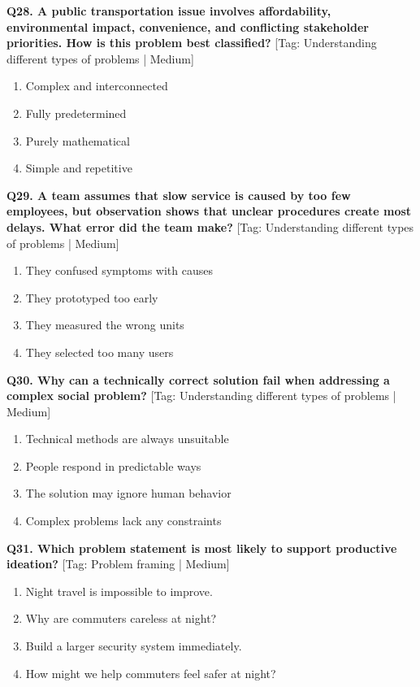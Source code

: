\noindent\textbf{Q28. A public transportation issue involves affordability, environmental impact, convenience, and conflicting stakeholder priorities. How is this problem best classified?} \hfill [Tag: Understanding different types of problems | Medium]
\begin{enumerate}[label=(\alph*),topsep=2pt,itemsep=1pt,partopsep=0pt,parsep=0pt]
    \item {Complex and interconnected}
    \item {Fully predetermined}
    \item {Purely mathematical}
    \item {Simple and repetitive}
\end{enumerate}
\vspace{2mm}

\noindent\textbf{Q29. A team assumes that slow service is caused by too few employees, but observation shows that unclear procedures create most delays. What error did the team make?} \hfill [Tag: Understanding different types of problems | Medium]
\begin{enumerate}[label=(\alph*),topsep=2pt,itemsep=1pt,partopsep=0pt,parsep=0pt]
    \item {They confused symptoms with causes}
    \item {They prototyped too early}
    \item {They measured the wrong units}
    \item {They selected too many users}
\end{enumerate}
\vspace{2mm}

\noindent\textbf{Q30. Why can a technically correct solution fail when addressing a complex social problem?} \hfill [Tag: Understanding different types of problems | Medium]
\begin{enumerate}[label=(\alph*),topsep=2pt,itemsep=1pt,partopsep=0pt,parsep=0pt]
    \item {Technical methods are always unsuitable}
    \item {People respond in predictable ways}
    \item {The solution may ignore human behavior}
    \item {Complex problems lack any constraints}
\end{enumerate}
\vspace{2mm}

\noindent\textbf{Q31. Which problem statement is most likely to support productive ideation?} \hfill [Tag: Problem framing | Medium]
\begin{enumerate}[label=(\alph*),topsep=2pt,itemsep=1pt,partopsep=0pt,parsep=0pt]
    \item {Night travel is impossible to improve.}
    \item {Why are commuters careless at night?}
    \item {Build a larger security system immediately.}
    \item {How might we help commuters feel safer at night?}
\end{enumerate}
\vspace{2mm}


